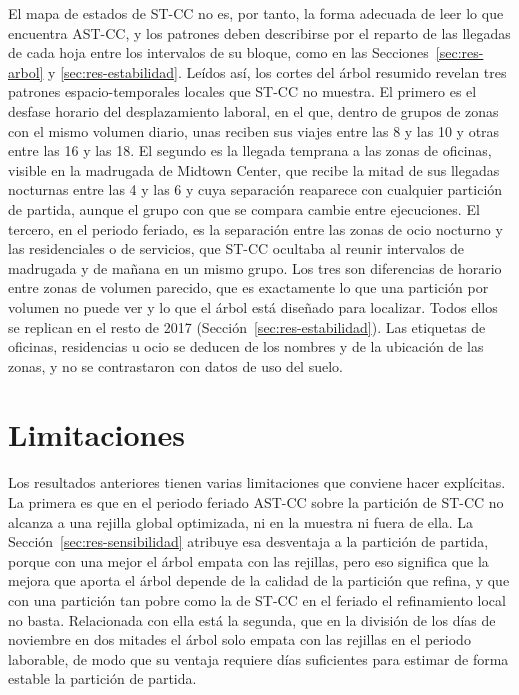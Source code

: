 El mapa de estados de ST-CC no es, por tanto, la forma adecuada de leer lo que
encuentra AST-CC, y los patrones deben describirse por el reparto de las llegadas
de cada hoja entre los intervalos de su bloque, como en las
Secciones~\ref{sec:res-arbol} y \ref{sec:res-estabilidad}. Leídos así, los
cortes del árbol resumido revelan tres patrones espacio-temporales locales que
ST-CC no muestra. El primero es el desfase horario del desplazamiento laboral,
en el que, dentro de grupos de zonas con el mismo volumen diario, unas reciben sus
viajes entre las 8 y las 10 y otras entre las 16 y las 18. El segundo es la
llegada temprana a las zonas de oficinas, visible en la madrugada de Midtown
Center, que recibe la mitad de sus llegadas nocturnas entre las 4 y las 6 y cuya
separación reaparece con cualquier partición de partida, aunque el grupo con que
se compara cambie entre ejecuciones. El
tercero, en el periodo feriado, es la separación entre las zonas de ocio nocturno
y las residenciales o de servicios, que ST-CC ocultaba al reunir intervalos de
madrugada y de mañana en un mismo grupo. Los tres son diferencias de horario
entre zonas de volumen parecido, que es exactamente lo que una partición por
volumen no puede ver y lo que el árbol está diseñado para localizar. Todos ellos
se replican en el resto de 2017 (Sección~\ref{sec:res-estabilidad}). Las
etiquetas de oficinas, residencias u ocio se deducen de los nombres y de la
ubicación de las zonas, y no se contrastaron con datos de uso del suelo.

\section{Limitaciones}\label{sec:res-limitaciones}

Los resultados anteriores tienen varias limitaciones que conviene hacer
explícitas. La primera es que en el periodo feriado AST-CC sobre la partición de
ST-CC no alcanza a una rejilla global optimizada, ni en la muestra ni fuera de
ella. La Sección~\ref{sec:res-sensibilidad} atribuye esa desventaja a la partición
de partida, porque con una mejor el árbol empata con las rejillas, pero eso
significa que la mejora que aporta el árbol depende de la calidad de la partición
que refina, y que con una partición tan pobre como la de ST-CC en el feriado el
refinamiento local no basta. Relacionada con ella está la segunda, que en la
división de los días de noviembre en dos mitades el árbol solo empata con las
rejillas en el periodo laborable, de modo que su ventaja requiere días suficientes
para estimar de forma estable la partición de partida.

